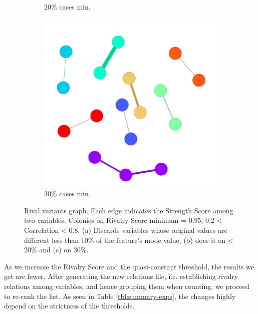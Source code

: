 \begin{figure}[!ht]
\begin{subfigure}[b]{0.30\linewidth}
		\caption{20\% cases min.}
	\end{subfigure}
	\hfill
	\begin{subfigure}[b]{0.30\linewidth}
		\includegraphics[width=\linewidth]{Minor Thesis/figures/graphs/main/g95302028.png}
		\caption{30\% cases min.}
	\end{subfigure}
	\hfill
    \caption{Rival variants graph. Each edge indicates the Strength Score among two variables. Colonies on Rivalry Score minimum = 0.95, 0.2 < Correlation < 0.8. (a) Discards variables whose original values are different less than 10\% of the feature's mode value, (b) does it on < 20\% and (c) on 30\%.}
    \label{fig:main-graphs}
\end{figure}

As we increase the Rivalry Score and the quasi-constant threshold, the results we get are fewer. After generating the new relations file, i.e. establishing rivalry relations among variables, and hence grouping them when counting, we proceed to re-rank the list. As seen in Table \ref{tbl:summary-exps}, the changes highly depend on the strictness of the thresholds. 

